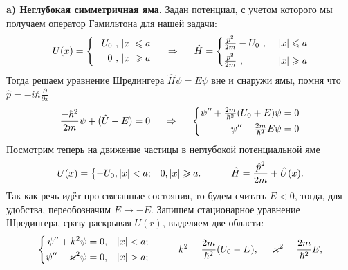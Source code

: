 \textbf{a) Неглубокая симметричная яма}. 
Задан потенциал, с учетом которого мы получаем оператор Гамильтона для нашей задачи:
\begin{equation*}
	U(x) = \left\{\begin{aligned}
		-U_0 \ , \ &|x| \leq a \\
		0 \ , \ &|x| \geq a
	\end{aligned}
	\right.
	\hspace{0.5 cm}
	\Rightarrow
	\hspace{0.5 cm}
	\hat{H} = \left\{\begin{aligned}
		&\tfrac{p^2}{2m} - U_0 \ , \ &|x| \leq a \\
		&\tfrac{p^2}{2m} \ , \ &|x| \geq a	
	\end{aligned}
	\right.
\end{equation*}
Тогда решаем уравнение Шредингера $\hat{H} \psi = E \psi$ вне и снаружи ямы, помня что $\hat{p} = - i \hbar \frac{\partial}{\partial x}$
\begin{equation*}
\frac{- \hbar^2}{2 m} \psi + (\hat{U} - E) = 0
\hspace{0.5 cm}
\Rightarrow
\hspace{0.5 cm}
\left\{\begin{aligned}
	\psi'' + \tfrac{2 m}{\hbar^2}(U_0 + E) \psi = 0 \\
	\psi'' + \tfrac{2 m}{\hbar^2} E \psi = 0
\end{aligned}\right.
\end{equation*}
Посмотрим теперь на движение частицы в неглубокой потенциальной яме 
\begin{equation*}
    U(x) = \left\{\begin{aligned}
        - &U_0, |x| < a;
        &0, |x| \geq a.
    \end{aligned}\right.
    \hspace{10 mm} 
    \hat{H} = \frac{\hat{p}^2}{2m} + \hat{U}(x).
\end{equation*}
Так как речь идёт про связанные состояния, то будем считать $E<0$, тогда, для удобства, переобозначим $E \to -E$.
Запишем стационарное уравнение Шредингера, сразу раскрывая $U(r)$, выделяем две области:
\begin{equation*}
    \left\{\begin{aligned}
        \psi'' + k^2 \psi &= 0,  &|x| < a; \\
        \psi'' - \kappa^2 \psi &= 0, &|x| > a;
    \end{aligned}\right.
    \hspace{10 mm} 
    k^2 = \frac{2m}{\hbar^2} (U_0 - E),
    \hspace{5 mm} 
    \kappa^2 = \frac{2m}{\hbar^2} E,
\end{equation*}
